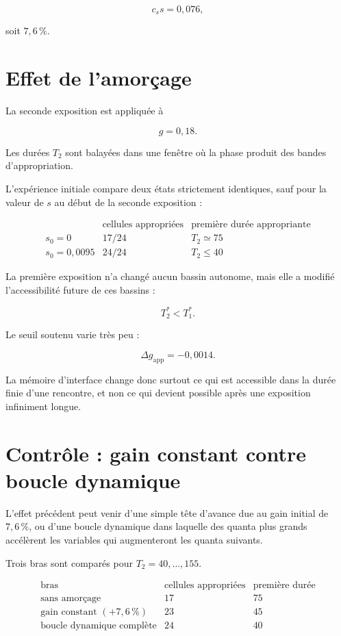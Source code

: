 \[
c_ss=0{,}076,
\]

soit \(7{,}6\,\%\).

\section{Effet de l'amorçage}
\label{annexe-num-effet-amorcage}

La seconde exposition est appliquée à

\[
g=0{,}18.
\]

Les durées \(T_2\) sont balayées dans une fenêtre où la phase produit
des bandes d'appropriation.

L'expérience initiale compare deux états strictement identiques, sauf
pour la valeur de \(s\) au début de la seconde exposition :

\[
\begin{array}{c|cc}
 & \text{cellules appropriées} & \text{première durée appropriante}\\
\hline
s_0=0 & 17/24 & T_2\simeq75\\
s_0=0{,}0095 & 24/24 & T_2\leq40
\end{array}
\]

La première exposition n'a changé aucun bassin autonome, mais elle a
modifié l'accessibilité future de ces bassins :

\[
\boxed{T_2^\ast<T_1^\ast.}
\]

Le seuil soutenu varie très peu :

\[
\Delta g_{\mathrm{app}}=-0{,}0014.
\]

La mémoire d'interface change donc surtout ce qui est accessible dans
la durée finie d'une rencontre, et non ce qui devient possible après
une exposition infiniment longue.

\section{Contrôle : gain constant contre boucle dynamique}
\label{annexe-num-controle-gain-boucle}

L'effet précédent peut venir d'une simple tête d'avance due au gain
initial de \(7{,}6\,\%\), ou d'une boucle dynamique dans laquelle des
quanta plus grands accélèrent les variables qui augmenteront les
quanta suivants.

Trois bras sont comparés pour \(T_2=40,\ldots,155\).

\[
\begin{array}{l|cc}
\text{bras} & \text{cellules appropriées} & \text{première durée}\\
\hline
\text{sans amorçage} & 17 & 75\\
\text{gain constant }(+7{,}6\,\%) & 23 & 45\\
\text{boucle dynamique complète} & 24 & 40
\end{array}
\]

